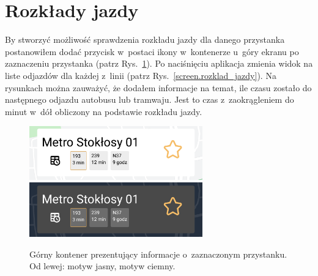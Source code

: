 \documentclass{SGGW-thesis}
\begin{document}
\section{Rozkłady jazdy}
By stworzyć możliwość sprawdzenia rozkładu jazdy dla danego przystanka postanowiłem dodać przycisk w~postaci ikony w~kontenerze u~góry ekranu po zaznaczeniu przystanka (patrz Rys.~\ref{screen.topbox}).
Po naciśnięciu aplikacja zmienia widok na liste odjazdów dla każdej z~linii (patrz Rys.~\ref{screen.rozklad_jazdy}).
Na rysunkach można zauważyć, że dodałem informacje na temat, ile czasu zostało do następnego odjazdu autobusu lub tramwaju.
Jest to czas z~zaokrągleniem do minut w~dół obliczony na podstawie rozkładu jazdy.
\begin{figure}[!htb]
  \centering
  \includegraphics[width=75mm]{screeny/topbox_jasny}
  \enspace
  \includegraphics[width=75mm]{screeny/topbox_ciemny}
  \caption[Górny kontener]{
    \label{screen.topbox}
    Górny kontener prezentujący informacje o~zaznaczonym przystanku. Od lewej: motyw jasny, motyw ciemny. \vspace{2ex}
  }
\end{figure}
\end{document}
